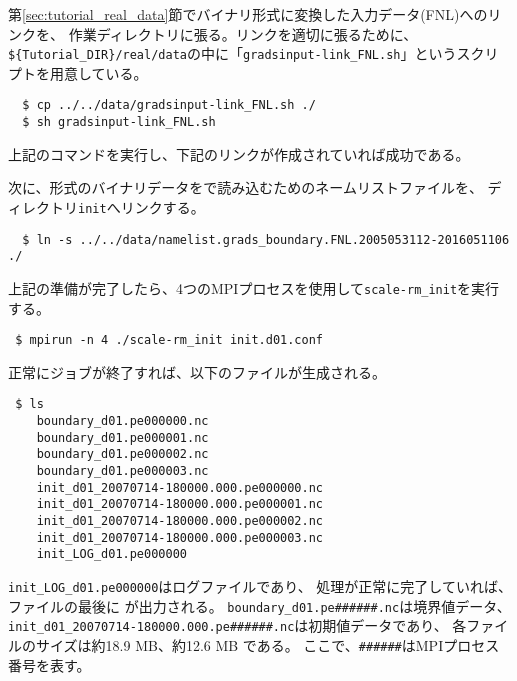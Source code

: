 第\ref{sec:tutorial_real_data}節でバイナリ形式に変換した入力データ(FNL)へのリンクを、
作業ディレクトリに張る。リンクを適切に張るために、\verb|${Tutorial_DIR}/real/data|の中に「\verb|gradsinput-link_FNL.sh|」というスクリプトを用意している。
\begin{verbatim}
  $ cp ../../data/gradsinput-link_FNL.sh ./
  $ sh gradsinput-link_FNL.sh
\end{verbatim}
上記のコマンドを実行し、下記のリンクが作成されていれば成功である。

次に、{\grads}形式のバイナリデータを{\scalelib}で読み込むためのネームリストファイルを、
ディレクトリ\verb|init|へリンクする。
\begin{verbatim}
  $ ln -s ../../data/namelist.grads_boundary.FNL.2005053112-2016051106 ./
\end{verbatim}
%
上記の準備が完了したら、4つのMPIプロセスを使用して\verb|scale-rm_init|を実行する。
\begin{verbatim}
 $ mpirun -n 4 ./scale-rm_init init.d01.conf
\end{verbatim}

正常にジョブが終了すれば、以下のファイルが生成される。
\begin{verbatim}
 $ ls
    boundary_d01.pe000000.nc
    boundary_d01.pe000001.nc
    boundary_d01.pe000002.nc
    boundary_d01.pe000003.nc
    init_d01_20070714-180000.000.pe000000.nc
    init_d01_20070714-180000.000.pe000001.nc
    init_d01_20070714-180000.000.pe000002.nc
    init_d01_20070714-180000.000.pe000003.nc
    init_LOG_d01.pe000000
\end{verbatim}
\verb|init_LOG_d01.pe000000|はログファイルであり、
処理が正常に完了していれば、ファイルの最後に
が出力される。
\verb|boundary_d01.pe######.nc|は境界値データ、
\verb|init_d01_20070714-180000.000.pe######.nc|は初期値データであり、
各ファイルのサイズは約18.9 MB、約12.6 MB である。
ここで、\verb|######|はMPIプロセス番号を表す。

